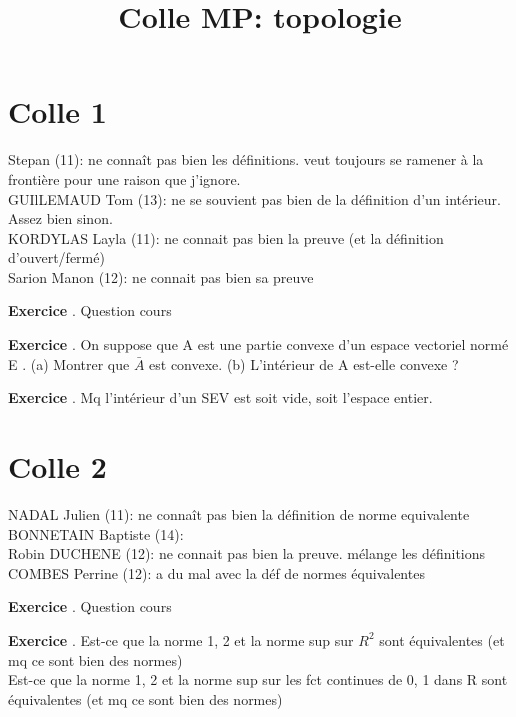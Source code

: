 \documentclass[10pt,a4paper]{article}
\title{Colle MP: topologie}
\newcounter{question}
\newcounter{exo}
\newenvironment{exo}{\vspace{0.5cm}\setcounter{question}{0}\addtocounter{exo}{1} \noindent \textbf{Exercice \theexo}. \normalsize }{\par}
\begin{document}
	\maketitle
	
	\section*{Colle 1}
	Stepan (11): ne connaît pas bien les définitions. veut toujours se ramener à la frontière pour une raison que j'ignore.\\
	GUIlLEMAUD Tom (13): ne se souvient pas bien de la définition d'un intérieur. Assez bien sinon.\\
	KORDYLAS Layla (11): ne connait pas bien la preuve (et la définition d'ouvert/fermé)\\
	Sarion Manon (12): ne connait pas bien sa preuve\\
	
	\begin{exo}
		Question cours
	\end{exo}

	\begin{exo}
		On suppose que A est une partie convexe d'un espace vectoriel normé E .
		(a) Montrer que $\bar{A}$ est convexe.
		(b) L'intérieur de A est-elle convexe ?
	\end{exo}
	
	\begin{exo}
		Mq l'intérieur d'un SEV est soit vide, soit l'espace entier.
	\end{exo}
	
	\section*{Colle 2}
	\setcounter{exo}{0}
	NADAL Julien (11): ne connaît pas bien la définition de norme equivalente \\
	BONNETAIN Baptiste (14):\\
	Robin DUCHENE (12): ne connait pas bien la preuve. mélange les définitions \\
	COMBES Perrine (12): a du mal avec la déf de normes équivalentes\\
	
	\begin{exo}
		Question cours
	\end{exo}

	\begin{exo}
		Est-ce que la norme 1, 2 et la norme sup sur $R^2$ sont équivalentes (et mq ce sont bien des normes)\\
		Est-ce que la norme 1, 2 et la norme sup sur les fct continues de 0, 1 dans R sont équivalentes (et mq ce sont bien des normes)
	\end{exo}
	
\end{document}
